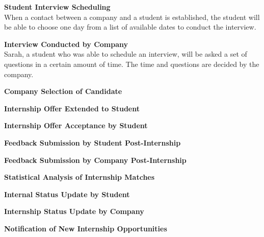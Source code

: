 {\begin{enumerate}[label=\textbf{[\arabic*]}, left = 0 pt, align = left]
            \item \textbf{Student Interview Scheduling}  
            \\When a contact between a company and a student is established, the student will be able to choose one day from a list of available dates to conduct the interview.
            \item \textbf{Interview Conducted by Company}                        
            \\ Sarah, a student who was able to schedule an interview, will be asked a set of questions in a certain amount of time. The time and questions are decided by the company.
            \item \textbf{Company Selection of Candidate}                        
            \\
            \item \textbf{Internship Offer Extended to Student}                  
            \\
            \item \textbf{Internship Offer Acceptance by Student}                
            \\
            \item \textbf{Feedback Submission by Student Post-Internship}        
            \\
            \item \textbf{Feedback Submission by Company Post-Internship}        
            \\
            \item \textbf{Statistical Analysis of Internship Matches}            
            \\
            \item \textbf{Internal Status Update by Student}                     
            \\
            \item \textbf{Internship Status Update by Company}                   
            \\
            \item \textbf{Notification of New Internship Opportunities}          
            \\
            
            \end{enumerate}
        }
    
    \newpage
